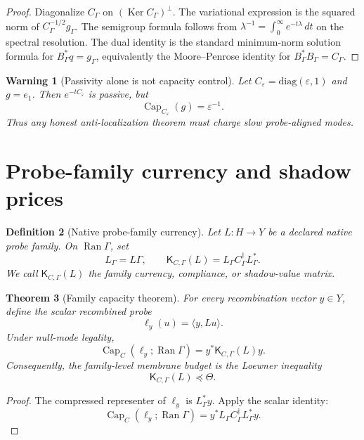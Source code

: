 \documentclass[11pt]{article}
\newtheorem{theorem}{Theorem}[section]
\newtheorem{definition}[theorem]{Definition}
\newtheorem{warning}[theorem]{Warning}
\DeclareMathOperator{\range}{Ran}
\DeclareMathOperator{\kernel}{Ker}
\DeclareMathOperator{\Capacity}{Cap}
\newcommand{\K}{\mathsf K}
\newcommand{\eps}{\varepsilon}
\begin{document}
\begin{proof}
Diagonalize \(C_\Gamma\) on \((\kernel C_\Gamma)^\perp\).  The variational expression is the squared norm of \(C_\Gamma^{-1/2}g_\Gamma\).  The semigroup formula follows from \(\lambda^{-1}=\int_0^\infty e^{-t\lambda}\,dt\) on the spectral resolution.  The dual identity is the standard minimum-norm solution formula for \(B_\Gamma^*q=g_\Gamma\), equivalently the Moore--Penrose identity for \(B_\Gamma^*B_\Gamma=C_\Gamma\).
\end{proof}

\begin{warning}[Passivity alone is not capacity control]
Let \(C_\eps=\mathrm{diag}(\eps,1)\) and \(g=e_1\).  Then \(e^{-tC_\eps}\) is passive, but
\[
  \Capacity_{C_\eps}(g)=\eps^{-1}.
\]
Thus any honest anti-localization theorem must charge slow probe-aligned modes.
\end{warning}

\section{Probe-family currency and shadow prices}

\begin{definition}[Native probe-family currency]
Let \(L:H\to Y\) be a declared native probe family.  On \(\range\Gamma\), set
\[
  L_\Gamma=L\Gamma,
  \qquad
  \K_{C,\Gamma}(L)=L_\Gamma C_\Gamma^\dagger L_\Gamma^*.
\]
We call \(\K_{C,\Gamma}(L)\) the family currency, compliance, or shadow-value matrix.
\end{definition}

\begin{theorem}[Family capacity theorem]
For every recombination vector \(y\in Y\), define the scalar recombined probe
\[
  \ell_y(u)=\langle y,Lu\rangle.
\]
Under null-mode legality,
\[
  \Capacity_C(\ell_y;\range\Gamma)=y^*\K_{C,\Gamma}(L)y.
\]
Consequently, the family-level membrane budget is the Loewner inequality
\[
  \K_{C,\Gamma}(L)\preceq\Theta.
\]
\end{theorem}

\begin{proof}
The compressed representer of \(\ell_y\) is \(L_\Gamma^*y\).  Apply the scalar identity:
\[
  \Capacity_C(\ell_y;\range\Gamma)
  =y^*L_\Gamma C_\Gamma^\dagger L_\Gamma^*y.
\]
\end{proof}
\end{document}
